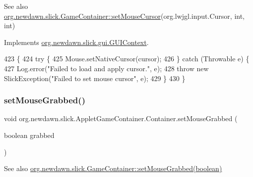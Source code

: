 \begin{DoxySeeAlso}{See also}
\mbox{\hyperlink{classorg_1_1newdawn_1_1slick_1_1_game_container_a13e789e67755f14bad1caf70e3bd6d4e}{org.\+newdawn.\+slick.\+Game\+Container\+::set\+Mouse\+Cursor}}(org.\+lwjgl.\+input.\+Cursor, int, int) 
\end{DoxySeeAlso}


Implements \mbox{\hyperlink{interfaceorg_1_1newdawn_1_1slick_1_1gui_1_1_g_u_i_context_a659a53b877f78b793fe3e6206c7c4a0c}{org.\+newdawn.\+slick.\+gui.\+G\+U\+I\+Context}}.


\begin{DoxyCode}
423                                                                                                   \{
424          \textcolor{keywordflow}{try} \{
425             Mouse.setNativeCursor(cursor);
426          \} \textcolor{keywordflow}{catch} (Throwable e) \{
427             Log.error(\textcolor{stringliteral}{"Failed to load and apply cursor."}, e);
428             \textcolor{keywordflow}{throw} \textcolor{keyword}{new} SlickException(\textcolor{stringliteral}{"Failed to set mouse cursor"}, e);
429          \}
430       \}
\end{DoxyCode}
\mbox{\label{classorg_1_1newdawn_1_1slick_1_1_applet_game_container_1_1_container_a65f7a506d56900f58e23e38be4460f5a}} 
\subsubsection{\texorpdfstring{set\+Mouse\+Grabbed()}{setMouseGrabbed()}}
{\footnotesize\ttfamily void org.\+newdawn.\+slick.\+Applet\+Game\+Container.\+Container.\+set\+Mouse\+Grabbed (\begin{DoxyParamCaption}\item[{boolean}]{grabbed }\end{DoxyParamCaption})\hspace{0.3cm}{\ttfamily [inline]}}

\begin{DoxySeeAlso}{See also}
\mbox{\hyperlink{classorg_1_1newdawn_1_1slick_1_1_game_container_aaefa09c4a1a2d83a1e2e44a9c6972030}{org.\+newdawn.\+slick.\+Game\+Container\+::set\+Mouse\+Grabbed(boolean)}} 
\end{DoxySeeAlso}

